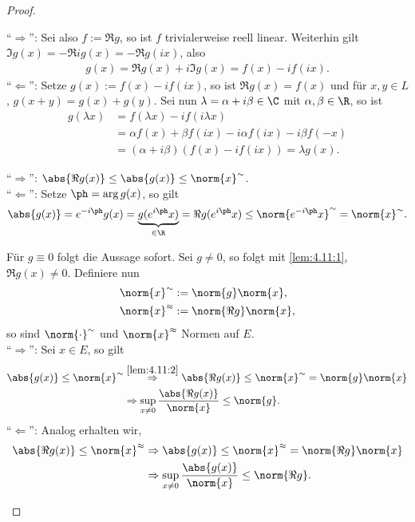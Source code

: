 \begin{proof}
\begin{proofenum}
  \item ``$\Rightarrow$'': Sei also $f:=\Re g$, so ist $f$ trivialerweise reell
  linear. Weiterhin gilt $\Im g(x) = -\Re ig(x) = -\Re g(ix)$, also
\begin{align*}
g(x) = \Re g(x) + i\Im g(x) = f(x)-if(ix). 
\end{align*}
``$\Leftarrow$'': Setze $g(x) := f(x) -if(ix)$, so ist $\Re g(x) = f(x)$ und
für $x,y\in L$, $g(x+y) = g(x) + g(y)$. Sei nun $\lambda=\alpha+i\beta \in \C$
mit $\alpha,\beta\in\R$, so ist
\begin{align*}
g(\lambda x) &= f(\lambda x) - if(i\lambda x) \\ &= \alpha f(x) + \beta f(ix) -
i\alpha f(ix) -i\beta f(-x)\\
&= (\alpha+i\beta)(f(x)-if(ix)) = \lambda g(x).
\end{align*}
\item ``$\Rightarrow$'': $\abs{\Re g(x)}\le \abs{g(x)} \le \norm{x}^\sim$.\\
``$\Leftarrow$'': Setze $\ph=\arg g(x)$, so gilt
\begin{align*}
\abs{g(x)} = e^{-i\ph}g(x) = \underbrace{g(e^{i\ph}x)}_{\in\R}
= \Re g(e^{i\ph}x) \le \norm{e^{-i\ph}x}^\sim = \norm{x}^\sim.
\end{align*}
\item Für $g\equiv 0$ folgt die Aussage sofort. Sei $g\neq 0$, so folgt mit
\ref{lem:4.11:1}, $\Re g(x) \neq 0$. Definiere nun
\begin{align*}
&\norm{x}^\sim := \norm{g}\norm{x},\\
&\norm{x}^{\approx} := \norm{\Re g}\norm{x},
\end{align*}
so sind $\norm{\cdot}^\sim$ und $\norm{x}^\approx$ Normen auf $E$.\\
``$\Rightarrow$'': Sei $x\in
E$, so gilt
\begin{align*}
\abs{g(x)} \le \norm{x}^\sim &\overset{\ref{lem:4.11:2}}{\Rightarrow}
\abs{\Re g(x)} \le \norm{x}^\sim  = \norm{g}\norm{x}\\
&\Rightarrow \sup\limits_{x\neq 0} \frac{\abs{\Re g(x)}}{\norm{x}} \le
\norm{g}.
\end{align*}
``$\Leftarrow$'': Analog erhalten wir,
\begin{align*}
\abs{\Re g(x)}\le \norm{x}^\approx 
&\Rightarrow \abs{g(x)} \le \norm{x}^\approx = \norm{\Re g}\norm{x}\\
&\Rightarrow
\sup\limits_{x\neq 0}
\frac{\abs{g(x)}}{\norm{x}} \le \norm{\Re g}.\qedhere
\end{align*}
\end{proofenum}
\end{proof}

